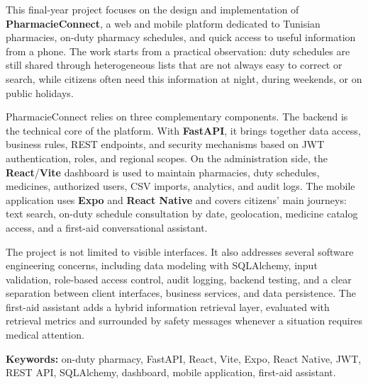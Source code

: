 This final-year project focuses on the design and implementation of \textbf{PharmacieConnect}, a web and
mobile platform dedicated to Tunisian pharmacies, on-duty pharmacy schedules, and quick access to useful
information from a phone. The work starts from a practical observation: duty schedules are still shared
through heterogeneous lists that are not always easy to correct or search, while citizens often need this
information at night, during weekends, or on public holidays.

PharmacieConnect relies on three complementary components. The backend is the technical core of the
platform. With \textbf{FastAPI}, it brings together data access, business rules, REST endpoints, and
security mechanisms based on JWT authentication, roles, and regional scopes. On the administration side,
the \textbf{React}/\textbf{Vite} dashboard is used to maintain pharmacies, duty schedules, medicines,
authorized users, CSV imports, analytics, and audit logs. The mobile application uses \textbf{Expo}
and \textbf{React Native} and covers citizens' main journeys: text search, on-duty schedule consultation
by date, geolocation, medicine catalog access, and a first-aid conversational assistant.

The project is not limited to visible interfaces. It also addresses several software engineering concerns,
including data modeling with SQLAlchemy, input validation, role-based access control, audit logging,
backend testing, and a clear separation between client interfaces, business services, and data
persistence. The first-aid assistant adds a hybrid information retrieval layer, evaluated with retrieval
metrics and surrounded by safety messages whenever a situation requires medical attention.

\textbf{Keywords:} on-duty pharmacy, FastAPI, React, Vite, Expo, React Native, JWT, REST API,
SQLAlchemy, dashboard, mobile application, first-aid assistant.
